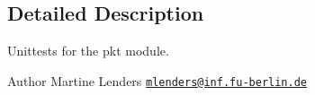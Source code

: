 \subsection{Detailed Description}
Unittests for the {\ttfamily pkt} module. 

\begin{DoxyAuthor}{Author}
Martine Lenders \href{mailto:mlenders@inf.fu-berlin.de}{\tt mlenders@inf.\+fu-\/berlin.\+de} 
\end{DoxyAuthor}
